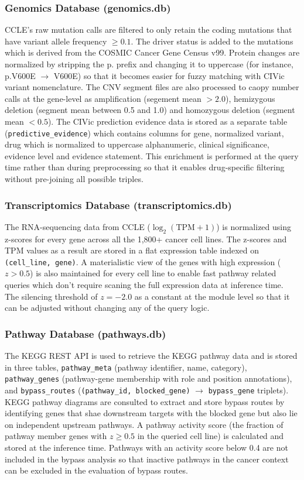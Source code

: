 \documentclass{article}
\begin{document}
\subsubsection{Genomics Database (genomics.db)}
CCLE's raw mutation calls are filtered to only retain the coding mutations that have variant allele frequency $\geq 0.1$. The driver status is added to the mutations which is derived from the COSMIC Cancer Gene Census v99. Protein changes are normalized by stripping the p. prefix and changing it to uppercase (for instance, p.V600E $\rightarrow$ V600E) so that it becomes easier for fuzzy matching with CIVic variant nomenclature. The CNV segment files are also processed to caopy number calls at the gene-level as amplification (segement mean $>2.0$), hemizygous deletion (segment mean between 0.5 and 1.0) and homozygous deletion (segment mean $<0.5$). The CIVic prediction evidence data is stored as a separate table (\texttt{predictive\_evidence}) which contains columns for gene, normalized variant, drug which is normalized to uppercase alphanumeric, clinical significance, evidence level and evidence statement. This enrichment is performed at the query time rather than during preprocessing so that it enables drug-specific filtering without pre-joining all possible triples. 

\subsubsection{Transcriptomics Database (transcriptomics.db)}
The RNA-sequencing data from CCLE ($\log_2(\mathrm{TPM}+1)$) is normalized using z-scores for every gene across all the 1,800+ cancer cell lines. The z-scores and TPM values as a result are stored in a flat expression table indexed on \texttt{(cell\_line, gene)}. A materialistic view of the genes with high expression ($z > 0.5$) is also maintained for every cell line to enable fast pathway related queries which don't require scaning the full expression data at inference time. The silencing threshold of $z = -2.0$ as a constant at the module level so that it can be adjusted without changing any of the query logic. 

\subsubsection{Pathway Database (pathways.db)}

The KEGG REST API is used to retrieve the KEGG pathway data and is stored in three tables, \texttt{pathway\_meta} (pathway identifier, name, category), \texttt{pathway\_genes} (pathway-gene membership with role and position annotations), and \texttt{bypass\_routes} (\texttt{(pathway\_id, blocked\_gene)} $\rightarrow$ \texttt{bypass\_gene} triplets). KEGG pathway diagrams are consulted to extract and store bypass routes by identifying genes that shae downstream targets with the blocked gene but also lie on independent upstream pathways. A pathway activity score (the fraction of pathway member genes with $z \geq 0.5$ in the queried cell line) is calculated and stored at the inference time. Pathways with an activity score below 0.4 are not included in the bypass analysis so that inactive pathways in the cancer context can be excluded in the evaluation of bypass routes. 
\end{document}
